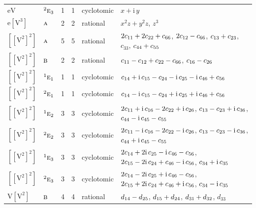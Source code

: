 \documentclass[10pt,a4paper]{article}
\numberwithin{equation}{section}
\newcommand{\irr}[1]{\text{\normalfont\scshape #1}}
\newcommand{\conjpair}[1]{{}^{#1}}
\newcommand{\iunit}{\mathrm{i}}
\newcommand{\jahn}[1]{\mathrm{#1}}
\newlength{\fillwidth}\newlength{\cellwidth}\newlength{\colwidth}
\newcommand{\signbreak}{\penalty100\relax}
\begin{document}
{\begin{longtable}{@{}llrrl>{\RaggedRight\arraybackslash}p{\fillwidth}@{}}
$\jahn{eV}$ & $\conjpair{2}\irr{e}_{3}$ & 1 & 1 & cyclotomic & $x + \iunit{}\,y$\\
$\jahn{e[V^{3}]}$ & $\irr{a}$ & 2 & 2 & rational & $x^{2}z + y^{2}z$, $z^{3}$\\
$\jahn{[[V^{2}]^{2}]}$ & $\irr{a}$ & 5 & 5 & rational & $2c_{11} +\signbreak 2c_{22} +\signbreak c_{66}$, $2c_{12} -\signbreak c_{66}$, $c_{13} +\signbreak c_{23}$, $c_{33}$, $c_{44} +\signbreak c_{55}$\\
$\jahn{[[V^{2}]^{2}]}$ & $\irr{b}$ & 2 & 2 & rational & $c_{11} -\signbreak c_{12} +\signbreak c_{22} -\signbreak c_{66}$, $c_{16} -\signbreak c_{26}$\\
$\jahn{[[V^{2}]^{2}]}$ & $\conjpair{1}\irr{e}_{1}$ & 1 & 1 & cyclotomic & $c_{14} +\signbreak \iunit{}\,c_{15} -\signbreak c_{24} -\signbreak \iunit{}\,c_{25} -\signbreak \iunit{}\,c_{46} +\signbreak c_{56}$\\
$\jahn{[[V^{2}]^{2}]}$ & $\conjpair{2}\irr{e}_{1}$ & 1 & 1 & cyclotomic & $c_{14} -\signbreak \iunit{}\,c_{15} -\signbreak c_{24} +\signbreak \iunit{}\,c_{25} +\signbreak \iunit{}\,c_{46} +\signbreak c_{56}$\\
$\jahn{[[V^{2}]^{2}]}$ & $\conjpair{1}\irr{e}_{2}$ & 3 & 3 & cyclotomic & $2c_{11} +\signbreak \iunit{}\,c_{16} -\signbreak 2c_{22} +\signbreak \iunit{}\,c_{26}$, $c_{13} -\signbreak c_{23} +\signbreak \iunit{}\,c_{36}$, $c_{44} -\signbreak \iunit{}\,c_{45} -\signbreak c_{55}$\\
$\jahn{[[V^{2}]^{2}]}$ & $\conjpair{2}\irr{e}_{2}$ & 3 & 3 & cyclotomic & $2c_{11} -\signbreak \iunit{}\,c_{16} -\signbreak 2c_{22} -\signbreak \iunit{}\,c_{26}$, $c_{13} -\signbreak c_{23} -\signbreak \iunit{}\,c_{36}$, $c_{44} +\signbreak \iunit{}\,c_{45} -\signbreak c_{55}$\\
$\jahn{[[V^{2}]^{2}]}$ & $\conjpair{1}\irr{e}_{3}$ & 3 & 3 & cyclotomic & $2c_{14} +\signbreak 2\iunit{}\,c_{25} -\signbreak \iunit{}\,c_{46} -\signbreak c_{56}$, $2c_{15} -\signbreak 2\iunit{}\,c_{24} +\signbreak c_{46} -\signbreak \iunit{}\,c_{56}$, $c_{34} +\signbreak \iunit{}\,c_{35}$\\
$\jahn{[[V^{2}]^{2}]}$ & $\conjpair{2}\irr{e}_{3}$ & 3 & 3 & cyclotomic & $2c_{14} -\signbreak 2\iunit{}\,c_{25} +\signbreak \iunit{}\,c_{46} -\signbreak c_{56}$, $2c_{15} +\signbreak 2\iunit{}\,c_{24} +\signbreak c_{46} +\signbreak \iunit{}\,c_{56}$, $c_{34} -\signbreak \iunit{}\,c_{35}$\\
$\jahn{V[V^{2}]}$ & $\irr{b}$ & 4 & 4 & rational & $d_{14} -\signbreak d_{25}$, $d_{15} +\signbreak d_{24}$, $d_{31} +\signbreak d_{32}$, $d_{33}$\\

\end{longtable}}
\end{document}

